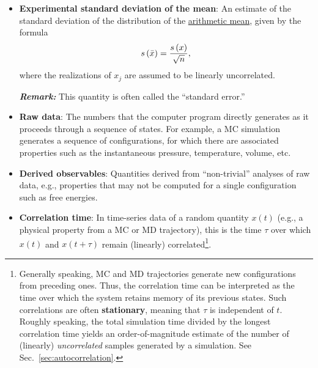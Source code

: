 \begin{itemize}
\item {\bf Experimental standard deviation of the mean}: An estimate of the standard deviation of the distribution of the \hyperref[def:arith_mean]{arithmetic mean}, given by the formula
  \begin{equation}
    s\left( \bar{x} \right) = \dfrac{s\left( x \right)}{\sqrt{n}}, \label{def:exp_st_dev_mean}
  \end{equation}
  where the realizations of $x_j$ are assumed to be linearly uncorrelated.

\smallskip
\textbf{\textit{Remark:}} This quantity is often called the ``standard error.''


\item {\bf Raw data}: The numbers that the computer program directly generates as it proceeds through a sequence of states.
For example, a MC simulation generates a sequence of configurations, for which there are associated properties such as the instantaneous pressure, temperature, volume, etc.
\label{def:raw_data}
\item {\bf Derived observables}: Quantities derived from ``non-trivial'' analyses of raw data, e.g., properties that may not be computed for a single configuration such as free energies.
  \label{def:deriv_obs}


\item {\bf Correlation time}: In time-series data of a random quantity $x(t)$ (e.g., a physical property from a MC or MD trajectory), this is the time $\tau$ over which $x(t)$ and $x(t+\tau)$ remain (linearly) correlated\footnote{Generally speaking, MC and MD trajectories generate new configurations from preceding ones.
Thus, the correlation time can be interpreted as the time over which the system retains memory of its previous states.
Such correlations are often {\bf stationary}, meaning that $\tau$ is independent of $t$.
Roughly speaking, the total simulation time divided by the longest correlation time yields an order-of-magnitude estimate of the number of (linearly) {\it uncorrelated} samples generated by a simulation. See Sec.~\ref{sec:autocorrelation}.}.
\label{def:corr_time}


\end{itemize}
